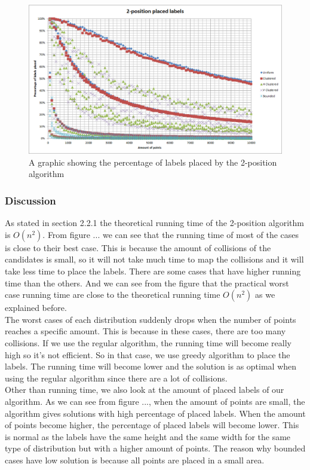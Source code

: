 \documentclass[crop=false,a4paper,oneside,11pt]{standalone}
\begin{document}
\begin{figure}[h!]
 \centering
  \centerline{\includegraphics[scale = 0.5]{2PosLabelsPlaced.png}}
  \caption{A graphic showing the percentage of labels placed by the 2-position algorithm}
 \end{figure}
 
\subsubsection{Discussion}
As stated in section 2.2.1 the theoretical running time of the 2-position algorithm is $O(n^2)$. From figure ... we can see that the running time of most of the cases is close to their best case. This is because the amount of collisions of the candidates is small, so it will not take much time to map the collisions and it will take less time to place the labels. There are some cases that have higher running time than the others. And we can see from the figure that the practical worst case running time are close to the theoretical running time $O(n^2)$ as we explained before. \\
The worst cases of each distribution suddenly drops when the number of points reaches a specific amount. This is because in these cases, there are too many collisions. If we use the regular algorithm, the running time will become really high so it's not efficient. So in that case, we use greedy algorithm to place the labels. The running time will become lower and the solution is as optimal when using the regular algorithm since there are a lot of collisions.\\
Other than running time, we also look at the amount of placed labels of our algorithm. As we can see from figure ..., when the amount of points are small, the algorithm gives solutions with high percentage of placed labels. When the amount of points become higher, the percentage of placed labels will become lower. This is normal as the labels have the same height and the same width for the same type of distribution but with a higher amount of points. The reason why bounded cases have low solution is because all points are placed in a small area.\\
\end{document}
